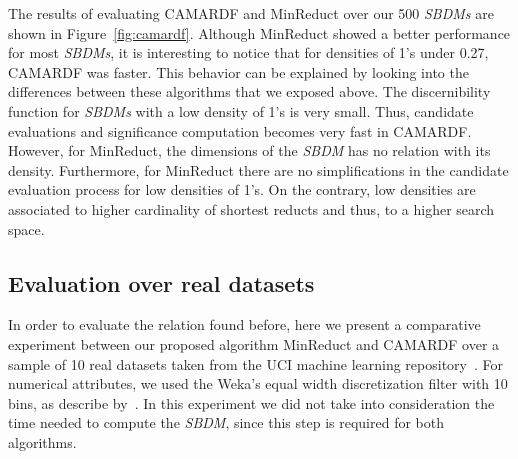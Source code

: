 \documentclass[authoryear,11pt]{elsarticle}
\begin{document}
   The results of evaluating CAMARDF and MinReduct over our 500 \textit{SBDMs} are shown in Figure~\ref{fig:camardf}. Although MinReduct showed a better performance for most \textit{SBDMs}, it is interesting to notice that for densities of 1's under 0.27, CAMARDF was faster. This behavior can be explained by looking into the differences between these algorithms that we exposed above. The discernibility function for \textit{SBDMs} with a low density of 1's is very small. Thus, candidate evaluations and significance computation becomes very fast in CAMARDF. However, for MinReduct, the dimensions of the \textit{SBDM} has no relation with its density. Furthermore, for MinReduct there are no simplifications in the candidate evaluation process for low densities of 1's. On the contrary, low densities are associated to higher cardinality of shortest reducts and thus, to a higher search space.
   
\subsection{Evaluation over real datasets}

  In order to evaluate the relation found before, here we present a comparative experiment between our proposed algorithm MinReduct and CAMARDF over a sample of 10 real datasets taken from the UCI machine learning repository~\citep{Bache13}. For numerical attributes, we used the Weka's equal width discretization filter with 10 bins, as describe by~\cite{Flores2010}. In this experiment we did not take into consideration the time needed to compute the \textit{SBDM}, since this step is required for both algorithms. 
\end{document}
